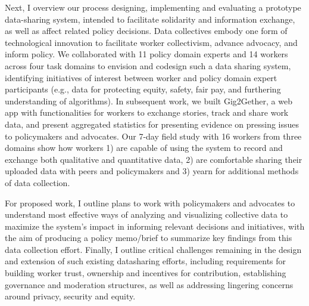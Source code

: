 Next, I overview our process designing, implementing and evaluating a prototype data-sharing system, intended to facilitate solidarity and information exchange, as well as affect related policy decisions. Data collectives embody one form of technological innovation to facilitate worker collectivism, advance advocacy, and inform policy. We collaborated with 11 policy domain experts and 14 workers across four task domains to envision and codesign such a data sharing system, identifying initiatives of interest between worker and policy domain expert participants (e.g., data for protecting equity, safety, fair pay, and furthering understanding of algorithms). In subsequent work, we built Gig2Gether, a web app with functionalities for workers to exchange stories, track and share work data, and present aggregated statistics for presenting evidence on pressing issues to policymakers and advocates. Our 7-day field study with 16 workers from three domains show how workers 1) are capable of using the system to record and exchange both qualitative and quantitative data, 2) are comfortable sharing their uploaded data with peers and policymakers and 3) yearn for additional methods of data collection.

For proposed work, I outline plans to work with policymakers and advocates to understand most effective ways of analyzing and visualizing collective data to maximize the system's impact in informing relevant decisions and initiatives, with the aim of producing a policy memo/brief to summarize key findings from this data collection effort. 
Finally, I outline critical challenges remaining in the design and extension of such existing datasharing efforts, including requirements for building worker trust, ownership and incentives for contribution, establishing governance and moderation structures, as well as addressing lingering concerns around privacy, security and equity. 

\vfill

\endgroup			

\vfill